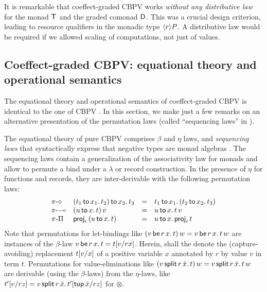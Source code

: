 \documentclass[acmsmall,review,anonymous]{acmart}\settopmatter{printfolios=true,printccs=false,printacmref=false}
\begin{document}
It is remarkable that coeffect-graded CBPV works \emph{without any
  distributive law} \cite{orchard:icfp16}
for the monad $\T$ and the graded comonad $\D$.
%
This was a crucial design criterion, leading to resource qualifiers in
the monadic type $\compty r P$.
%
A distributive law would be required if we allowed scaling of
computations, not just of values.


\subsection{Coeffect-graded CBPV: equational theory and operational semantics}

The equational theory and operational semantics of coeffect-graded
CBPV is identical to the one of CBPV \citep[Fig.~11]{levy:hosc06}.  In
this section, we make just a few remarks on an alternative
presentation of the permutation laws (called ``sequencing laws'' in
\loccit).

The equational theory of pure CBPV comprises $\beta$ and $\eta$ laws,
and \emph{sequencing laws} that syntactically express that negative
types are monad algebras \citep[Fig.~11]{levy:hosc06}.  The sequencing
laws contain a generalization of the associativity law for monads and
allow to permute a bind under a $\lambda$ or record construction.  In
the presence of $\eta$ for functions and records, they are
inter-derivable with the following permutation laws:
\[
\begin{array}{llcl}
\rpi\diamond
  & \bind {x_2} {(\bind {x_1} {t_1} {t_2})} {t_3}
  & = & \bind {x_1} {t_1} {(\bind {x_2} {t_2} {t_3})}
\\
\rpi\lolli
  & \app {(\bind x u t)} v
  & = & \bind x u {\app t v}
\\
\rpi\Pi
  & \proj i {(\bind x  u t)}
  & = & \bind x u {\proj i t}
\end{array}
\]
Note that permutations for let-bindings like
$\app{(\qlet r x v t)}w = \qlet r x v {\app t w}$ are instances of the
$\beta$-law $\qlet r x v t = \qsubst v r x t$.
%
Herein,  shall the denote the
(capture-avoiding) replacement $\subst v x t$ of a positive variable
$x$ annotated by $r$ by value $v$ in term $t$.
%
Permutations for value-eliminations like
$\app {(\qsplits r v {\bar x} t)} w = \qsplits r v {\bar x} {\app t
  w}$
are derivable (using the $\beta$-laws) from the $\eta$-laws, like
$\qsubst{v}{r}{z}{t'} = \qsplits r {v} {\bar x} {\qsubst {\ptup {\bar
      x}} r z {t'}}$ for $\otimes$.
\end{document}
